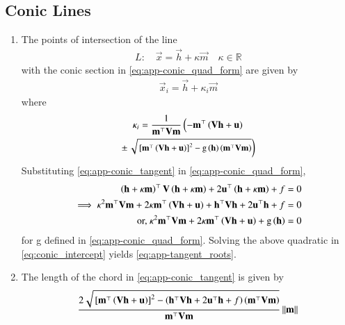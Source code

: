 \subsection{Conic Lines}
\begin{enumerate}[label=\thesubsection.\arabic*.,ref=\thesubsection.\theenumi]
 \item
	 \label{prop:chord}
  The points of intersection of the line 
\begin{align}
L: \quad \vec{x} = \vec{h} + \kappa \vec{m} \quad \kappa \in \mathbb{R}
\label{eq:app-conic_tangent}
\end{align}
with the conic section in \eqref{eq:app-conic_quad_form} are given by
\begin{align}
\vec{x}_i = \vec{h} + \kappa_i \vec{m}
	\label{eq:app-chord-pts}
\end{align}
%
where
\begin{multline}
\kappa_i = \frac{1}
{
\mathbf{m}^{\top}\mathbf{V}\mathbf{m}
}
\left(-\mathbf{m}^{\top}\left(\mathbf{V}\mathbf{h}+\mathbf{u}\right)\right.
\\
\pm
{\small
\ensuremath{\left.\sqrt{
{}\left[
\mathbf{m}^{\top}\left(\mathbf{V}\mathbf{h}+\mathbf{u}\right)
\right]^2
	-\text{g}
\left(\mathbf{h}
\right)
\left(\mathbf{m}^{\top}\mathbf{V}\mathbf{m}\right)
}
\right)}
}
\label{eq:app-tangent_roots}
\end{multline}
\solution
  Substituting \eqref{eq:app-conic_tangent}
in \eqref{eq:app-conic_quad_form}, 
\begin{align}
\left(\mathbf{h} + \kappa \mathbf{m}\right)^{\top}\mathbf{V}\left(\mathbf{h} + \kappa \mathbf{m}\right)  + 2 \mathbf{u}^{\top}\left(\mathbf{h} + \kappa \mathbf{m}\right)+f &= 0
\\
\implies \kappa^2\mathbf{m}^{\top}\mathbf{V}\mathbf{m} + 2 \kappa\mathbf{m}^{\top}\left(\mathbf{V}\mathbf{h}+\mathbf{u}\right) 
+ \mathbf{h}^{\top}\mathbf{V}\mathbf{h} + 2\mathbf{u}^{\top}\mathbf{h} +f &= 0
	\\
	\text{or, }
\kappa^2\mathbf{m}^{\top}\mathbf{V}\mathbf{m} + 2 \kappa\mathbf{m}^{\top}\left(\mathbf{V}\mathbf{h}+\mathbf{u}\right) 
	+ \text{g}\left(\mathbf{h}\right) &=0
\label{eq:conic_intercept}
\end{align}
for g defined in \eqref{eq:app-conic_quad_form}.
Solving the above quadratic in \eqref{eq:conic_intercept}
yields \eqref{eq:app-tangent_roots}.
	\item
		The length of the chord in 
\eqref{eq:app-conic_tangent}
is given by 
\begin{align}
 \frac{2\sqrt{
{}\left[
\mathbf{m}^{\top}\left(\mathbf{V}\mathbf{h}+\mathbf{u}\right)
\right]^2
-
\left(
\mathbf{h}^{\top}\mathbf{V}\mathbf{h} + 2\mathbf{u}^{\top}\mathbf{h} +f
\right)
\left(\mathbf{m}^{\top}\mathbf{V}\mathbf{m}\right)
}
}
{
\mathbf{m}^{\top}\mathbf{V}\mathbf{m}
}\left\lVert\mathbf{m}\right\rVert
\label{eq:chord-len}
  \end{align}
	

\end{enumerate}
